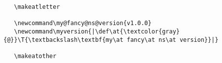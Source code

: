 \begin{frame}[fragile]
   \begin{lrbox}\CodeBox
   \begin{minipage}{.85\linewidth}
   \begin{verbatim}
   \makeatletter

   \newcommand\my@fancy@ns@version{v1.0.0}
   \newcommand\myversion{|\def\at{\textcolor{gray}{@}}\T{\textbackslash\textbf{my\at fancy\at ns\at version}}|}

   \makeatother
   \end{verbatim}
   \end{minipage}
   \end{lrbox}
   \begin{focus}
   \end{focus}
\end{frame}

\begin{frame}
   \begin{focus}
      \bigskip\\
   \end{focus}
\end{frame}

